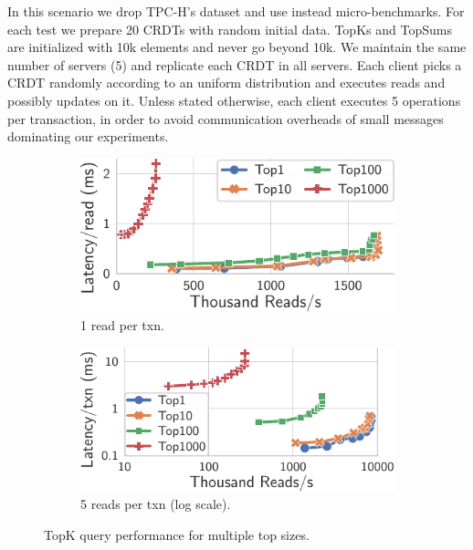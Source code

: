 \documentclass[sigconf, nonacm]{acmart}
\begin{document}
In this scenario we drop TPC-H's dataset and use instead micro-benchmarks.
For each test we prepare 20 CRDTs with random initial data.
TopKs and TopSums are initialized with 10k elements and never go beyond 10k.
We maintain the same number of servers (5) and replicate each CRDT in all servers.
Each client picks a CRDT randomly according to an uniform distribution and executes reads and possibly updates on it.
Unless stated otherwise, each client executes 5 operations per transaction, in order to avoid communication overheads of small messages dominating our experiments.


\begin{figure}
	\centering
	\begin{subfigure}{.481\linewidth}
		\includegraphics[width=1\linewidth]{singleQuery/bench_top_size_0_upd}
		\caption{1 read per txn.}
		\label{fig:topSize_single}
	\end{subfigure}%
	\hspace*{0.2em}
	\begin{subfigure}{.499\linewidth}
		\includegraphics[width=1\linewidth]{singleQuery/bench_top_size_0_upd_5b}
		\caption{5 reads per txn (log scale).}
		\label{fig:topSize_batch}
	\end{subfigure}%
	\vspace*{-0.65em}
	\caption{TopK query performance for multiple top sizes.}
	\label{fig:topSize}
	\vspace*{-0.2em} %
\end{figure}
\end{document}
